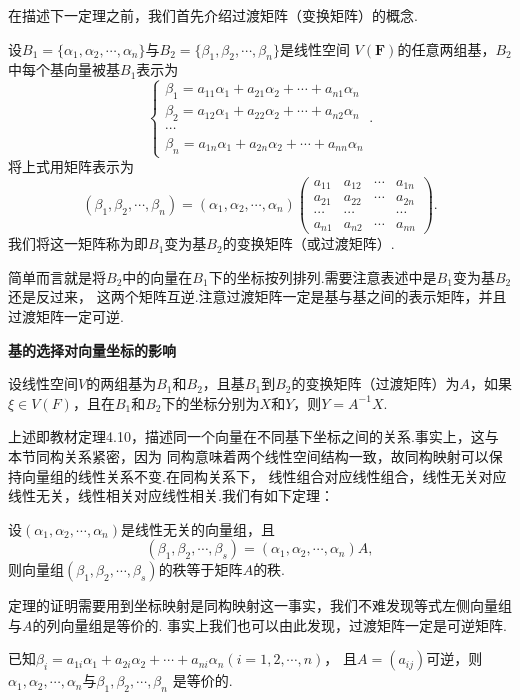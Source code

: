 在描述下一定理之前，我们首先介绍过渡矩阵（变换矩阵）的概念.
\begin{definition}
	设$B_1=\{\alpha_1,\alpha_2,\cdots,\alpha_n\}$与$B_2=\{\beta_1,\beta_2,\cdots,\beta_n\}$是线性空间
	$V(\mathbf{F})$的任意两组基，$B_2$中每个基向量被基$B_1$表示为
	$$\begin{cases}
		\beta_1=a_{11}\alpha_1+a_{21}\alpha_2+\cdots+a_{n1}\alpha_n \\
		\beta_2=a_{12}\alpha_1+a_{22}\alpha_2+\cdots+a_{n2}\alpha_n \\
		\cdots \\
		\beta_n=a_{1n}\alpha_1+a_{2n}\alpha_2+\cdots+a_{nn}\alpha_n
	\end{cases}.$$
	将上式用矩阵表示为
	$$(\beta_1,\beta_2,\cdots,\beta_n)=(\alpha_1,\alpha_2,\cdots,\alpha_n)\begin{pmatrix}
		a_{11} & a_{12} & \cdots & a_{1n} \\
		a_{21} & a_{22} & \cdots & a_{2n} \\
		\cdots & \cdots &        & \cdots \\
		a_{n1} & a_{n2} & \cdots & a_{nn}
	\end{pmatrix}.$$
	我们将这一矩阵称为即$B_1$变为基$B_2$的变换矩阵（或过渡矩阵）.
\end{definition}
简单而言就是将$B_2$中的向量在$B_1$下的坐标按列排列.需要注意表述中是$B_1$变为基$B_2$还是反过来，
这两个矩阵互逆.注意过渡矩阵一定是基与基之间的表示矩阵，并且过渡矩阵一定可逆.
\begin{theorem}
	\textbf{基的选择对向量坐标的影响}
	
	设线性空间$V$的两组基为$B_1$和$B_2$，且基$B_1$到$B_2$的变换矩阵（过渡矩阵）为$A$，如果
	$\xi \in V(F)$，且在$B_1$和$B_2$下的坐标分别为$X$和$Y$，则$Y=A^{-1}X$.
\end{theorem}
上述即教材定理4.10，描述同一个向量在不同基下坐标之间的关系.事实上，这与本节同构关系紧密，因为
同构意味着两个线性空间结构一致，故同构映射可以保持向量组的线性关系不变.在同构关系下，
线性组合对应线性组合，线性无关对应线性无关，线性相关对应线性相关.我们有如下定理：
\begin{theorem}
	设$(\alpha_1,\alpha_2,\cdots,\alpha_n)$是线性无关的向量组，且
	$$(\beta_1,\beta_2,\cdots,\beta_s)=(\alpha_1,\alpha_2,\cdots,\alpha_n)A,$$
	则向量组$(\beta_1,\beta_2,\cdots,\beta_s)$的秩等于矩阵$A$的秩.
\end{theorem}
定理的证明需要用到坐标映射是同构映射这一事实，我们不难发现等式左侧向量组与$A$的列向量组是等价的.
事实上我们也可以由此发现，过渡矩阵一定是可逆矩阵.
\begin{theorem}
	已知$\beta_i=a_{1i}\alpha_1+a_{2i}\alpha_2+\cdots+a_{ni}\alpha_n(i=1,2,\cdots,n)$，
	且$A=(a_{ij})$可逆，则$\alpha_1,\alpha_2,\cdots,\alpha_n$与$\beta_1,\beta_2,\cdots,\beta_n$
	是等价的.
\end{theorem}
